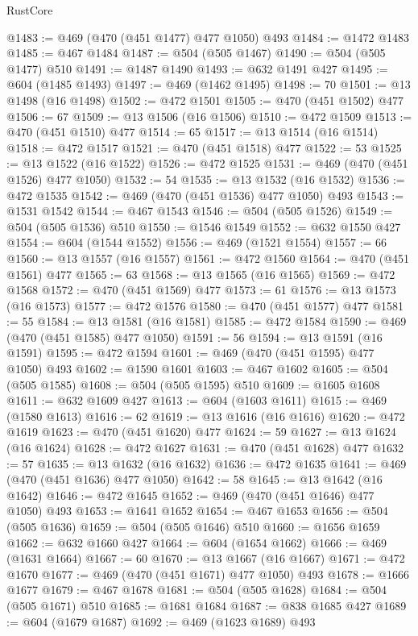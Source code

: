 \begin{lexlean}{RustCore}
\begin{coremodule}
@1483 := @469 (@470 (@451 @1477) @477 @1050) @493
@1484 := @1472 @1483
@1485 := @467 @1484
@1487 := @504 (@505 @1467)
@1490 := @504 (@505 @1477) @510
@1491 := @1487 @1490
@1493 := @632 @1491 @427
@1495 := @604 (@1485 @1493)
@1497 := @469 (@1462 @1495)
@1498 := 70
@1501 := @13 @1498 (@16 @1498)
@1502 := @472 @1501
@1505 := @470 (@451 @1502) @477
@1506 := 67
@1509 := @13 @1506 (@16 @1506)
@1510 := @472 @1509
@1513 := @470 (@451 @1510) @477
@1514 := 65
@1517 := @13 @1514 (@16 @1514)
@1518 := @472 @1517
@1521 := @470 (@451 @1518) @477
@1522 := 53
@1525 := @13 @1522 (@16 @1522)
@1526 := @472 @1525
@1531 := @469 (@470 (@451 @1526) @477 @1050)
@1532 := 54
@1535 := @13 @1532 (@16 @1532)
@1536 := @472 @1535
@1542 := @469 (@470 (@451 @1536) @477 @1050) @493
@1543 := @1531 @1542
@1544 := @467 @1543
@1546 := @504 (@505 @1526)
@1549 := @504 (@505 @1536) @510
@1550 := @1546 @1549
@1552 := @632 @1550 @427
@1554 := @604 (@1544 @1552)
@1556 := @469 (@1521 @1554)
@1557 := 66
@1560 := @13 @1557 (@16 @1557)
@1561 := @472 @1560
@1564 := @470 (@451 @1561) @477
@1565 := 63
@1568 := @13 @1565 (@16 @1565)
@1569 := @472 @1568
@1572 := @470 (@451 @1569) @477
@1573 := 61
@1576 := @13 @1573 (@16 @1573)
@1577 := @472 @1576
@1580 := @470 (@451 @1577) @477
@1581 := 55
@1584 := @13 @1581 (@16 @1581)
@1585 := @472 @1584
@1590 := @469 (@470 (@451 @1585) @477 @1050)
@1591 := 56
@1594 := @13 @1591 (@16 @1591)
@1595 := @472 @1594
@1601 := @469 (@470 (@451 @1595) @477 @1050) @493
@1602 := @1590 @1601
@1603 := @467 @1602
@1605 := @504 (@505 @1585)
@1608 := @504 (@505 @1595) @510
@1609 := @1605 @1608
@1611 := @632 @1609 @427
@1613 := @604 (@1603 @1611)
@1615 := @469 (@1580 @1613)
@1616 := 62
@1619 := @13 @1616 (@16 @1616)
@1620 := @472 @1619
@1623 := @470 (@451 @1620) @477
@1624 := 59
@1627 := @13 @1624 (@16 @1624)
@1628 := @472 @1627
@1631 := @470 (@451 @1628) @477
@1632 := 57
@1635 := @13 @1632 (@16 @1632)
@1636 := @472 @1635
@1641 := @469 (@470 (@451 @1636) @477 @1050)
@1642 := 58
@1645 := @13 @1642 (@16 @1642)
@1646 := @472 @1645
@1652 := @469 (@470 (@451 @1646) @477 @1050) @493
@1653 := @1641 @1652
@1654 := @467 @1653
@1656 := @504 (@505 @1636)
@1659 := @504 (@505 @1646) @510
@1660 := @1656 @1659
@1662 := @632 @1660 @427
@1664 := @604 (@1654 @1662)
@1666 := @469 (@1631 @1664)
@1667 := 60
@1670 := @13 @1667 (@16 @1667)
@1671 := @472 @1670
@1677 := @469 (@470 (@451 @1671) @477 @1050) @493
@1678 := @1666 @1677
@1679 := @467 @1678
@1681 := @504 (@505 @1628)
@1684 := @504 (@505 @1671) @510
@1685 := @1681 @1684
@1687 := @838 @1685 @427
@1689 := @604 (@1679 @1687)
@1692 := @469 (@1623 @1689) @493

\end{coremodule}
\end{lexlean}
